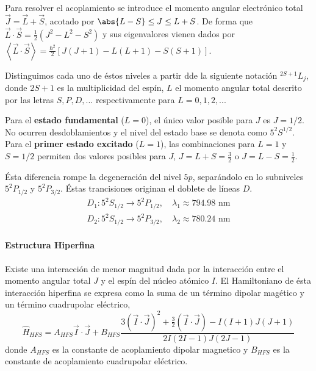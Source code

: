 Para resolver el acoplamiento se introduce el momento angular electrónico total $\vec{J} = \vec{L} + \vec{S}$, acotado por $\abs{L-S} \leq J \leq L + S$. De forma que $\vec{L} \cdot  \vec{S} = \frac{1}{2} \left(J^2 - L^2 -S^2\right)$ y sus eigenvalores vienen dados por $\left\langle \vec{L} \cdot \vec{S} \right\rangle = \frac{\hbar^2}{2} \left[J(J+1) - L(L+1) - S(S+1)\right]$.

Distinguimos cada uno de éstos niveles a partir dde la siguiente notación $^{2S +1}L_j$, donde $2S+1$ es la multiplicidad del espín, $L$ el momento angular total descrito por las letras $S, P, D, ...$ respectivamente para $L = 0,1,2,..$.

Para el \textbf{estado fundamental} ($L=0$), el único valor posible para $J$ es $J= 1/2$. No ocurren desdoblamientos y el nivel  del estado base se denota como $5^2S^{1/2}$. Para el \textbf{primer estado excitado} ($L = 1$), las combinaciones para $L=1$ y $S=1/2$ permiten dos valores posibles para $J$, $J = L+ S = \frac{3}{2}$ o $J = L - S = \frac{1}{2}$.

Ésta diferencia rompe la degeneración del nivel $5p$, separándolo en lo subniveles $5^2P_{1/2}$ y $5^2P_{3/2}$. Éstas trancisiones originan el doblete de líneas $D$.
\begin{equation}
    \begin{split}
        D_1: 5^2S_{1/2} \longrightarrow 5^2P_{1/2}, \quad \lambda_1 \approx 794.98 \text{ nm}\\
        D_2: 5^2S_{1/2} \longrightarrow 5^2P_{3/2}, \quad \lambda_2 \approx 780.24 \text{ nm}
    \end{split}
\end{equation}

\paragraph{Estructura Hiperfina}
Existe una interacción de menor magnitud dada por la interacción entre el momento angular total $J$ y el espín del núcleo atómico $I$. El Hamiltoniano de ésta interacción hiperfina se expresa como la suma de un término dipolar magético y un término cuadrupolar eléctrico,
\begin{equation}
    \hat{H}_{HFS} = A_{HFS} \vec{I} \cdot \vec{J} + B_{HFS} \frac{3(\vec{I} \cdot \vec{J})^2 + \frac{3}{2}(\vec{I} \cdot \vec{J}) - I(I+1)J(J+1)}{2I(2I-1)J(2J-1)}
\end{equation}
donde $A_{HFS}$ es la constante de acoplamiento dipolar magnetico y $B_{HFS}$ es la constante de acoplamiento cuadrupolar eléctrico.


